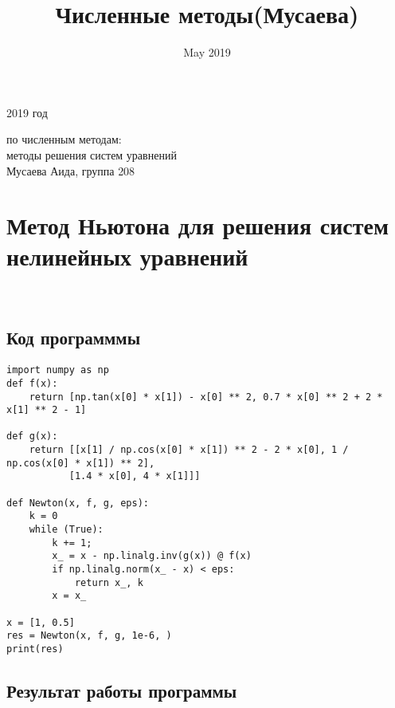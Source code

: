 \documentclass[12pt,a4paper]{article}
\title{Численные методы(Мусаева)}
\date{May 2019}
\begin{document}
\begin{titlepage}
\begin{center}
2019 год
\vspace {8cm}



{  по численным методам:\\ методы решения систем уравнений }\\
\vspace {8cm}
\bigskip Мусаева Аида, группа 208
\end{center}
\vfill


\vfill

\end{titlepage}

\section{Метод Ньютона для решения систем нелинейных уравнений}
\\

\subsection{Код программмы}
\begin{verbatim}
import numpy as np
def f(x):
    return [np.tan(x[0] * x[1]) - x[0] ** 2, 0.7 * x[0] ** 2 + 2 * x[1] ** 2 - 1]

def g(x):
    return [[x[1] / np.cos(x[0] * x[1]) ** 2 - 2 * x[0], 1 / np.cos(x[0] * x[1]) ** 2],
           [1.4 * x[0], 4 * x[1]]]

def Newton(x, f, g, eps):
    k = 0
    while (True):
        k += 1;
        x_ = x - np.linalg.inv(g(x)) @ f(x)
        if np.linalg.norm(x_ - x) < eps:
            return x_, k
        x = x_

x = [1, 0.5]
res = Newton(x, f, g, 1e-6, )
print(res)
\end{verbatim}
\subsection{Результат работы программы}
\end{document}
